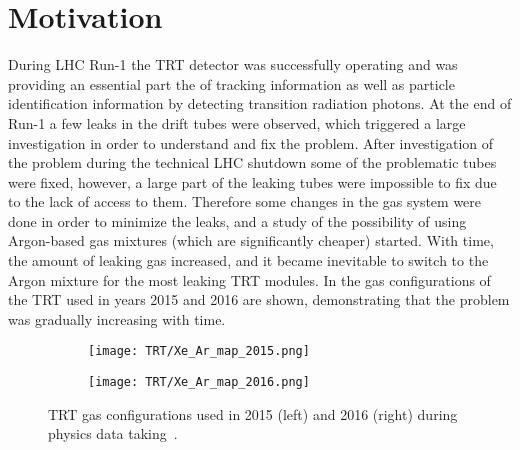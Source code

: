 \section{Motivation}
\label{sec:TRT_intro}

During LHC Run-1 the TRT detector was successfully operating and was providing an essential part the of tracking information 
as well as particle identification information by detecting transition radiation photons.
At the end of Run-1 
a few leaks in the drift tubes were observed, which triggered a large investigation in order to understand and fix the problem. 
After investigation of the problem during the technical LHC shutdown some of the problematic tubes were fixed, however, a large part of the leaking tubes were impossible to fix due to the lack of access to them.
Therefore some changes in the gas system were done in order to minimize the leaks, 
and a study of the possibility of using Argon-based gas mixtures (which are significantly cheaper) started. 
With time, the amount of leaking gas increased, and it became inevitable to switch to the Argon mixture 
for the most leaking TRT modules. In  the gas configurations of the TRT used in years 2015 and 2016 are shown, demonstrating that the problem was gradually increasing with time.

\begin{figure}
\centering
\begin{subfigure}{.5\textwidth}
  \centering
  \texttt{[image: TRT/Xe\_Ar\_map\_2015.png]}
  \label{fig:sub1}
\end{subfigure}%
\begin{subfigure}{.5\textwidth}
  \centering
  \texttt{[image: TRT/Xe\_Ar\_map\_2016.png]}
  \label{fig:sub2}
\end{subfigure}
\caption{TRT gas configurations used in 2015 (left) and 2016 (right) during physics data taking~\cite{trt_public_plots_2016}.}
\label{fig:mixed_condition_2015_2016}
\end{figure}

